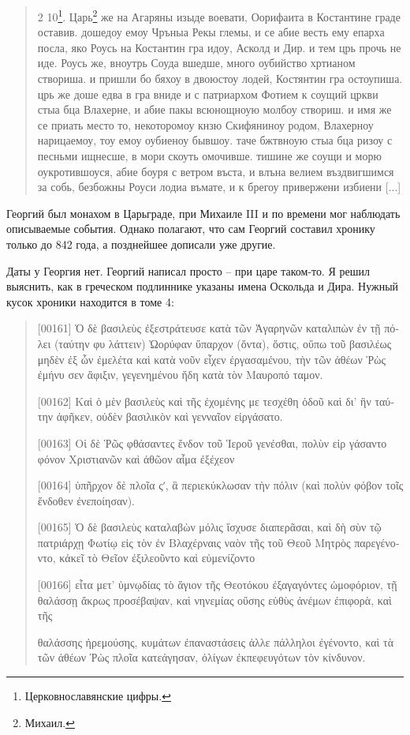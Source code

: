 \begin{quotation} 
2 10\footnote{Церковнославянские цифры.}. Царь\footnote{Михаил.} же на Агаряны изыде воевати, Оорифаита в Костантине граде оставив. дошедоу емоу Чръныа Рекы глемы, и се абие весть ему епарха посла, яко Роусь на Костантин гра идоу, Асколд и Дир. и тем црь прочь не иде. Роусь же, вноутрь Соуда вшедше, много оубийство хртианом створиша. и пришли бо бяхоу в двоюстоу лодей, Костянтин гра остоупиша. црь же доше едва в гра вниде и с патриархом Фотием к соущий цркви стыа бца Влахерне, и абие пакы всюнощноую молбоу створиш. и имя же се приать место то, некоторомоу кнзю Скифяниноу родом, Влахерноу нарицаемоу, тоу емоу оубиеноу бывшоу. таче бжтвноую стыа бца ризоу с песньми ищнесше, в мори скоуть омочивше. тишине же соущи и морю оукротившоуся, абие боуря с  ветром въста, и влъна велием въздвигшимся за собь, безбожны Роуси лодиа въмате, и к брегоу привержени избиени [...]
\end{quotation}

Георгий был монахом в Царьграде, при Михаиле III и по времени мог наблюдать описываемые события. Однако полагают, что сам Георгий составил хронику только до 842 года, а позднейшее дописали уже другие.

Даты у Георгия нет. Георгий написал просто – при царе таком-то. Я решил выяснить, как в греческом подлиннике указаны имена Оскольда и Дира. Нужный кусок хроники находится в томе 4\cite{amartol02}:

\begin{otherlanguage}{greek}
\begin{quotation}
[00161] Ὁ δὲ βασιλεὺς ἐξεστράτευσε κατὰ τῶν Ἀγαρ\-ηνῶν καταλιπὼν ἐν τῇ πόλει (ταύτην φυ λάττειν) Ὠορ\-ύφαν ὕπαρχον (ὄντα), ὅστις, οὔπω τοῦ βασιλέως
μηδὲν ἐξ ὧν ἐμελέτα καὶ κατὰ νοῦν εἶχεν ἐργασαμένου, τὴν τῶν ἀθέων Ῥὼς ἐμήνυ σεν ἄφιξιν, γεγενημένου ἤδη κατὰ τὸν Μαυροπό ταμον.

[00162] Καὶ ὁ μὲν βασιλεὺς καὶ τῆς ἐχομένης με τεσχέθη ὁδοῦ καὶ δι' ἣν ταύτην ἀφῆκεν, οὐδὲν βασιλικὸν καὶ γενναῖον εἰργάσατο.

[00163] Οἱ δὲ Ῥῶς φθάσαντες ἔνδον τοῦ Ἱεροῦ γενέσ\-θαι, πολὺν εἰρ γάσαντο φόνον Χριστιανῶν καὶ ἀθῶον αἷμα ἐξέχεον

[00164] ὑπῆρχον δὲ πλοῖα ςʹ, ἃ περιεκύκλωσαν τὴν πόλιν (καὶ πολὺν φόβον τοῖς ἔνδοθεν ἐνεποίη\-σαν).

[00165] Ὁ δὲ βασιλεὺς καταλαβὼν μόλις ἴσχυ\-σε διαπερᾶσαι, καὶ δὴ σὺν τῷ πατριάρχῃ Φωτίῳ εἰς τὸν ἐν Βλαχέρναις ναὸν τῆς τοῦ Θεοῦ Μητρὸς
παρεγένοντο, κἀκεῖ τὸ Θεῖον ἐξιλεοῦντο καὶ εὐμε\-νίζο\-ντο

[00166] εἶτα μετ' ὑμνῳδίας τὸ ἅγιον τῆς Θεοτό\-κου ἐξαγαγόντες ὠμοφόριον, τῇ θαλάσσῃ ἄκρως προσέβα\-ψαν, καὶ νηνεμίας οὔσης εὐθὺς ἀνέμων ἐπιφορὰ, καὶ τῆς 

θαλάσσης ἠρεμούσης, κυμάτων ἐπαναστά\-σεις ἀλλε πάλληλοι ἐγένοντο, καὶ τὰ τῶν ἀθέων Ῥὼς πλοῖα κατεάγησαν, ὀλίγων ἐκπεφευγότων τὸν κίνδυνον.
\end{quotation}
\end{otherlanguage}

